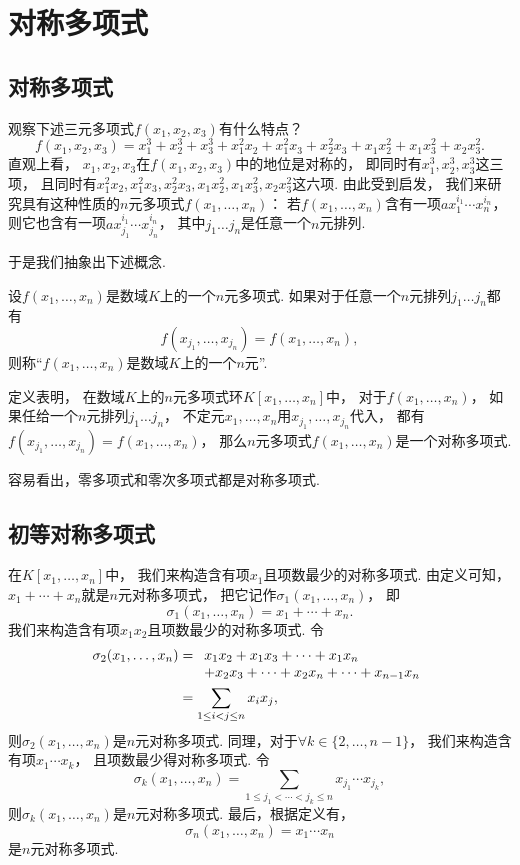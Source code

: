 \section{对称多项式}
\subsection{对称多项式}
观察下述三元多项式\(f(x_1,x_2,x_3)\)有什么特点？
\[
	f(x_1,x_2,x_3)
	=x_1^3+x_2^3+x_3^3
	+x_1^2x_2
	+x_1^2x_3
	+x_2^2x_3
	+x_1x_2^2
	+x_1x_3^2
	+x_2x_3^2.
\]
直观上看，
\(x_1,x_2,x_3\)在\(f(x_1,x_2,x_3)\)中的地位是对称的，
即同时有\(x_1^3,x_2^3,x_3^3\)这三项，
且同时有\(x_1^2x_2,
x_1^2x_3,
x_2^2x_3,
x_1x_2^2,
x_1x_3^2,
x_2x_3^2\)这六项.
由此受到启发，
我们来研究具有这种性质的\(n\)元多项式\(f(x_1,\dotsc,x_n)\)：
若\(f(x_1,\dotsc,x_n)\)含有一项\(a x_1^{i_1} \dotsm x_n^{i_n}\)，
则它也含有一项\(a x_{j_1}^{i_1} \dotsm x_{j_n}^{i_n}\)，
其中\(j_1 \dotso j_n\)是任意一个\(n\)元排列.

于是我们抽象出下述概念.
\begin{definition}
设\(f(x_1,\dotsc,x_n)\)是数域\(K\)上的一个\(n\)元多项式.
如果对于任意一个\(n\)元排列\(j_1 \dotso j_n\)都有\[
	f(x_{j_1},\dotsc,x_{j_n})
	=f(x_1,\dotsc,x_n),
\]
则称“\(f(x_1,\dotsc,x_n)\)是数域\(K\)上的一个\(n\)元”.
\end{definition}

定义表明，
在数域\(K\)上的\(n\)元多项式环\(K[x_1,\dotsc,x_n]\)中，
对于\(f(x_1,\dotsc,x_n)\)，
如果任给一个\(n\)元排列\(j_1 \dotso j_n\)，
不定元\(x_1,\dotsc,x_n\)用\(x_{j_1},\dotsc,x_{j_n}\)代入，
都有\(f(x_{j_1},\dotsc,x_{j_n})=f(x_1,\dotsc,x_n)\)，
那么\(n\)元多项式\(f(x_1,\dotsc,x_n)\)是一个对称多项式.

容易看出，零多项式和零次多项式都是对称多项式.

\subsection{初等对称多项式}
在\(K[x_1,\dotsc,x_n]\)中，
我们来构造含有项\(x_1\)且项数最少的对称多项式.
由定义可知，
\(x_1+\dotsb+x_n\)就是\(n\)元对称多项式，
把它记作\(\sigma_1(x_1,\dotsc,x_n)\)，
即\[
	\sigma_1(x_1,\dotsc,x_n)
	=x_1+\dotsb+x_n.
\]
我们来构造含有项\(x_1x_2\)且项数最少的对称多项式.
令\begin{align*}
	\sigma_2(x_1,\dotsc,x_n)
	&=\begin{array}[t]{l}
		x_1x_2+x_1x_3+\dotsb+x_1x_n \\
		+x_2x_3+\dotsb+x_2x_n
		+\dotsb
		+x_{n-1}x_n
	\end{array} \\
	&=\sum_{1\leq i<j\leq n} x_i x_j,
\end{align*}
则\(\sigma_2(x_1,\dotsc,x_n)\)是\(n\)元对称多项式.
同理，对于\(\forall k\in\{2,\dotsc,n-1\}\)，
我们来构造含有项\(x_1 \dotsm x_k\)，
且项数最少得对称多项式.
令\[
	\sigma_k(x_1,\dotsc,x_n)
	=\sum_{1\leq j_1<\dotsb<j_k\leq n}
	x_{j_1} \dotsm x_{j_k},
\]
则\(\sigma_k(x_1,\dotsc,x_n)\)是\(n\)元对称多项式.
最后，根据定义有，\[
	\sigma_n(x_1,\dotsc,x_n)
	=x_1 \dotsm x_n
\]是\(n\)元对称多项式.

